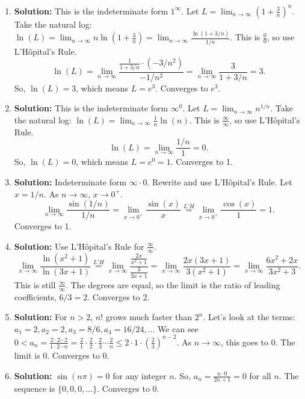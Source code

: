 \documentclass{article}
\begin{document}
\begin{enumerate}
    \item \textbf{Solution:} This is the indeterminate form $1^\infty$. Let $L = \lim_{n \to \infty} \left(1 + \frac{3}{n}\right)^n$.
    Take the natural log: $\ln(L) = \lim_{n \to \infty} n \ln\left(1 + \frac{3}{n}\right) = \lim_{n \to \infty} \frac{\ln(1+3/n)}{1/n}$.
    This is $\frac{0}{0}$, so use L'H\^opital's Rule.
    \[ \ln(L) = \lim_{n \to \infty} \frac{\frac{1}{1+3/n} \cdot (-3/n^2)}{-1/n^2} = \lim_{n \to \infty} \frac{3}{1+3/n} = 3. \]
    So, $\ln(L) = 3$, which means $L = e^3$. Converges to $e^3$.

    \item \textbf{Solution:} This is the indeterminate form $\infty^0$. Let $L = \lim_{n \to \infty} n^{1/n}$.
    Take the natural log: $\ln(L) = \lim_{n \to \infty} \frac{1}{n} \ln(n)$.
    This is $\frac{\infty}{\infty}$, so use L'H\^opital's Rule.
    \[ \ln(L) = \lim_{n \to \infty} \frac{1/n}{1} = 0. \]
    So, $\ln(L) = 0$, which means $L = e^0 = 1$. Converges to 1.

    \item \textbf{Solution:} Indeterminate form $\infty \cdot 0$. Rewrite and use L'H\^opital's Rule. Let $x = 1/n$. As $n \to \infty$, $x \to 0^+$.
    \[ \lim_{n \to \infty} \frac{\sin(1/n)}{1/n} = \lim_{x \to 0^+} \frac{\sin(x)}{x} \overset{L'H}{=} \lim_{x \to 0^+} \frac{\cos(x)}{1} = 1. \]
    Converges to 1.

    \item \textbf{Solution:} Use L'H\^opital's Rule for $\frac{\infty}{\infty}$.
    \[ \lim_{x \to \infty} \frac{\ln(x^2+1)}{\ln(3x+1)} \overset{L'H}{=} \lim_{x \to \infty} \frac{\frac{2x}{x^2+1}}{\frac{3}{3x+1}} = \lim_{x \to \infty} \frac{2x(3x+1)}{3(x^2+1)} = \lim_{x \to \infty} \frac{6x^2+2x}{3x^2+3}. \]
    This is still $\frac{\infty}{\infty}$. The degrees are equal, so the limit is the ratio of leading coefficients, $6/3 = 2$. Converges to 2.

    \item \textbf{Solution:} For $n > 2$, $n!$ grows much faster than $2^n$. Let's look at the terms:
    $a_1=2, a_2=2, a_3=8/6, a_4=16/24, \dots$
    We can see $0 < a_n = \frac{2 \cdot 2 \cdots 2}{1 \cdot 2 \cdots n} = \frac{2}{1} \cdot \frac{2}{2} \cdot \frac{2}{3} \cdots \frac{2}{n} \le 2 \cdot 1 \cdot \left(\frac{2}{3}\right)^{n-2}$. As $n \to \infty$, this goes to 0.
    The limit is 0. Converges to 0.

    \item \textbf{Solution:} $\sin(n\pi) = 0$ for any integer $n$. So, $a_n = \frac{n \cdot 0}{2n+1} = 0$ for all $n$.
    The sequence is $\{0, 0, 0, \dots\}$. Converges to 0.
    

\end{enumerate}
\end{document}
